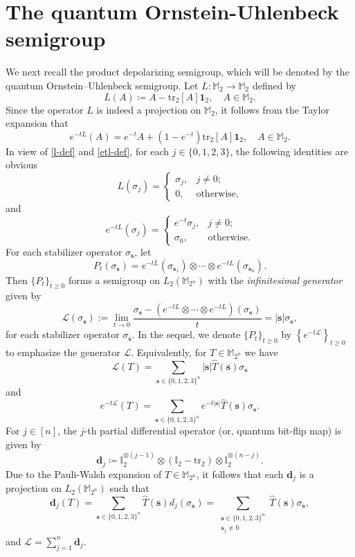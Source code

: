 \documentclass{amsbook}
\theoremstyle{definition}
\theoremstyle{remark}
\numberwithin{section}{chapter}
\numberwithin{equation}{chapter}
\newcommand{\M}{\mathbb{M}}
\newcommand{\1}{\mathbf{1}}
\newcommand{\s}{\mathbf{s}}
\newcommand{\tr}{\mathrm{tr}}
\newcommand{\dc}{\mathbf{d}}
\begin{document}
\section{The quantum Ornstein-Uhlenbeck semigroup}
We next recall the product depolarizing semigroup, which will be denoted by the quantum Ornstein--Uhlenbeck semigroup. Let $L:\mathbb{M}_2 \rightarrow\mathbb{M}_2$ defined by
\begin{equation}\label{l-def}
L(A)\coloneqq A-\tr_2[A]\mathbf{1}_2,\quad A\in \M_{2}.
\end{equation}
Since the operator $L$ is indeed a projection on $\mathbb{M}_{2}$, it follows from the Taylor expansion that
\begin{equation}\label{etl-def}
e^{-tL}(A)=e^{-t}A+(1-e^{-t})\tr_2[A]\mathbf{1}_2,\quad A\in \M_{2}.
\end{equation}
In view of \eqref{l-def} and \eqref{etl-def}, for each $j \in \{0,1,2,3\}$, the following identities are obvious
\[
L(\sigma_j) = 
\begin{cases} 
\sigma_j, & j \neq 0; \\ 
0, & \text{otherwise,} 
\end{cases}
\]
and
\[
e^{-tL}(\sigma_j) = 
\begin{cases} 
e^{-t} \sigma_j, & j \neq 0; \\ 
\sigma_0, & \text{otherwise.} 
\end{cases}
\]
For each stabilizer operator $\sigma_{\s}$, let
\[
P_t(\sigma_{\s}) = e^{-tL}(\sigma_{{\s}_1}) \otimes \cdots \otimes e^{-tL}(\sigma_{{\s}_n}).
\]
Then $\{P_{t}\}_{t\geq 0}$ forms a semigroup on $L_{2}(\M_{2^{n}})$ with the \emph{infinitesimal generator} given by
\[
\mathcal{L}(\sigma_{\s}) := \lim_{t \to 0} \frac{\sigma_{\s} - (e^{-tL} \otimes \cdots \otimes e^{-tL})(\sigma_{\s})}{t} = |\s| \sigma_{\s},
\]
for each stabilizer operator $\sigma_\s$. In the sequel, we denote $\{ P_t \}_{t \geq 0}$ by $\left\{e^{-t\mathcal{L}}\right\}_{t \geq 0}$ to emphasize the generator $\mathcal{L}$. Equivalently, for $T \in \mathbb{M}_{2^n}$ we have
\begin{equation}\label{l-def-2}
\mathcal{L}(T) = \sum_{\s \in \{0,1,2,3\}^n} |\s| \widehat{T}(\s) \sigma_\s
\end{equation}
and
\begin{equation}\label{et-l-def}
e^{-t\mathcal{L}}(T) = \sum_{\s \in \{0,1,2,3\}^n} e^{-t|\s|} \widehat{T}(\s) \sigma_\s.
\end{equation}
For $j \in [n]$, the $j$-th partial differential operator (or, quantum bit-flip map) is given by
\[
\dc_j\coloneqq\mathbb{I}_2^{\otimes (j-1)} \otimes (\mathbb{I}_2 - \tr_2) \otimes \mathbb{I}_2^{\otimes (n-j)}.
\]
Due to the Pauli-Walsh expansion of $T\in \M_{2^{n}}$, it follows that each $\dc_j$ is a projection on $L_{2}(\M_{2^{n}})$ such that
\begin{equation}\label{dj-def}
\dc_j(T) = \sum_{\s \in \{0,1,2,3\}^n} \widehat{T}(\s) d_j(\sigma_\s) = \sum_{\substack{\s \in \{0,1,2,3\}^n \\ \s_j \neq 0}} \widehat{T}(\s) \sigma_\s,
\end{equation}
and $\mathcal{L} = \sum_{j=1}^n \dc_j$.
\end{document}
